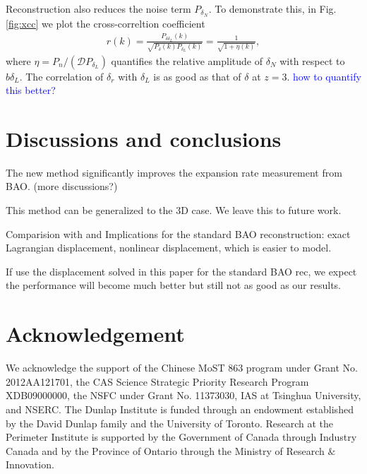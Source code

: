 \documentclass[aps,prd,twocolumn,showpacs,superscriptaddress,groupedaddress,nofootinbib]{revtex4}  %
\newcommand{\tcb}{\textcolor{blue}}
\newcommand{\bea}{\begin{eqnarray}}
\newcommand{\eea}{\end{eqnarray}}
\begin{document}

Reconstruction also reduces the noise term $P_{\delta_N}$. To demonstrate this,
in Fig. \ref{fig:xcc} we plot the  cross-correltion coefficient 
\bea
r(k)=\frac{P_{\delta\delta_L}(k)}
{\sqrt{P_{\delta}(k)P_{\delta_L}(k)}}
=\frac{1}{\sqrt{1+\eta(k)}},
\eea
where $\eta=P_n/(\mathcal{D}P_{\delta_L})$ quantifies the relative amplitude
of $\delta_N$ with respect to $b\delta_L$. The correlation of $\delta_r$ with
$\delta_L$ is as good as that of $\delta$ at $z=3$.
\tcb{how to quantify this better?}



\section{Discussions and conclusions}

The new method significantly
improves the expansion rate measurement from BAO. (more discussions?) 


This method can be generalized to the 3D case. 
We leave this
to future work.



Comparision with and Implications for the standard BAO reconstruction: exact 
Lagrangian displacement,
nonlinear displacement, which is easier to model.

If use the displacement solved in this paper for the standard BAO rec, we expect
the performance will become much better but still not as good as our results.

\section{Acknowledgement}
We acknowledge the support of the Chinese MoST 863 program under Grant 
No. 2012AA121701, the CAS Science Strategic Priority Research Program 
XDB09000000, the NSFC under Grant No. 11373030, IAS at Tsinghua University, 
 and NSERC.
The Dunlap Institute is funded through an endowment established by the David Dunlap family and the University of Toronto.
Research at the Perimeter Institute is supported by the Government of Canada
through Industry Canada and by the Province of Ontario through the Ministry of
Research $\&$ Innovation.



\end{document}
